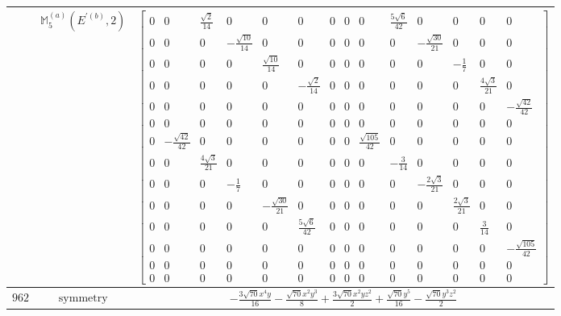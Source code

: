 \documentclass[fleqn,8pt,landscape]{jsarticle}
\begin{document}
\begin{longtable}{ccc}
$  $ & $ \mathbb{M}_{5}^{(a)}(E^{\prime(b)},2) $ & $ \begin{bmatrix} 0 & 0 & \frac{\sqrt{2}}{14} & 0 & 0 & 0 & 0 & 0 & 0 & \frac{5 \sqrt{6}}{42} & 0 & 0 & 0 & 0 \\ 0 & 0 & 0 & - \frac{\sqrt{10}}{14} & 0 & 0 & 0 & 0 & 0 & 0 & - \frac{\sqrt{30}}{21} & 0 & 0 & 0 \\ 0 & 0 & 0 & 0 & \frac{\sqrt{10}}{14} & 0 & 0 & 0 & 0 & 0 & 0 & - \frac{1}{7} & 0 & 0 \\ 0 & 0 & 0 & 0 & 0 & - \frac{\sqrt{2}}{14} & 0 & 0 & 0 & 0 & 0 & 0 & \frac{4 \sqrt{3}}{21} & 0 \\ 0 & 0 & 0 & 0 & 0 & 0 & 0 & 0 & 0 & 0 & 0 & 0 & 0 & - \frac{\sqrt{42}}{42} \\ 0 & 0 & 0 & 0 & 0 & 0 & 0 & 0 & 0 & 0 & 0 & 0 & 0 & 0 \\ 0 & - \frac{\sqrt{42}}{42} & 0 & 0 & 0 & 0 & 0 & 0 & \frac{\sqrt{105}}{42} & 0 & 0 & 0 & 0 & 0 \\ 0 & 0 & \frac{4 \sqrt{3}}{21} & 0 & 0 & 0 & 0 & 0 & 0 & - \frac{3}{14} & 0 & 0 & 0 & 0 \\ 0 & 0 & 0 & - \frac{1}{7} & 0 & 0 & 0 & 0 & 0 & 0 & - \frac{2 \sqrt{3}}{21} & 0 & 0 & 0 \\ 0 & 0 & 0 & 0 & - \frac{\sqrt{30}}{21} & 0 & 0 & 0 & 0 & 0 & 0 & \frac{2 \sqrt{3}}{21} & 0 & 0 \\ 0 & 0 & 0 & 0 & 0 & \frac{5 \sqrt{6}}{42} & 0 & 0 & 0 & 0 & 0 & 0 & \frac{3}{14} & 0 \\ 0 & 0 & 0 & 0 & 0 & 0 & 0 & 0 & 0 & 0 & 0 & 0 & 0 & - \frac{\sqrt{105}}{42} \\ 0 & 0 & 0 & 0 & 0 & 0 & 0 & 0 & 0 & 0 & 0 & 0 & 0 & 0 \\ 0 & 0 & 0 & 0 & 0 & 0 & 0 & 0 & 0 & 0 & 0 & 0 & 0 & 0 \end{bmatrix} $ \\ \hline
$ 962 $ & $ \text{symmetry} $ & $ - \frac{3 \sqrt{70} x^{4} y}{16} - \frac{\sqrt{70} x^{2} y^{3}}{8} + \frac{3 \sqrt{70} x^{2} y z^{2}}{2} + \frac{\sqrt{70} y^{5}}{16} - \frac{\sqrt{70} y^{3} z^{2}}{2} $ \\

\end{longtable}
\end{document}
